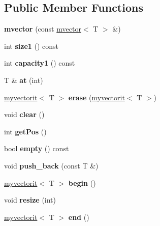 \subsection*{Public Member Functions}
\begin{DoxyCompactItemize}
\item 
\hypertarget{classmvector_a5eb821b582e42208a8b0eb96a3a8e1c0}{}{\bfseries mvector} (const \hyperlink{classmvector}{mvector}$<$ T $>$ \&)\label{classmvector_a5eb821b582e42208a8b0eb96a3a8e1c0}

\item 
\hypertarget{classmvector_a1a765c4c112032a89f4903515d6e8f4a}{}int {\bfseries size1} () const \label{classmvector_a1a765c4c112032a89f4903515d6e8f4a}

\item 
\hypertarget{classmvector_a4af7a5b896f47966d5a686cfa8ef399d}{}int {\bfseries capacity1} () const \label{classmvector_a4af7a5b896f47966d5a686cfa8ef399d}

\item 
\hypertarget{classmvector_ac1e8a58dd72be52c090058f50db96323}{}T \& {\bfseries at} (int)\label{classmvector_ac1e8a58dd72be52c090058f50db96323}

\item 
\hypertarget{classmvector_a4aa9329b30665373cd533e276cfb25cc}{}\hyperlink{classmyvectorit}{myvectorit}$<$ T $>$ {\bfseries erase} (\hyperlink{classmyvectorit}{myvectorit}$<$ T $>$)\label{classmvector_a4aa9329b30665373cd533e276cfb25cc}

\item 
\hypertarget{classmvector_a867f2a6f379c581732536269d2780a01}{}void {\bfseries clear} ()\label{classmvector_a867f2a6f379c581732536269d2780a01}

\item 
\hypertarget{classmvector_abc5bfa132b2e643fcea7c99331836236}{}int {\bfseries get\+Pos} ()\label{classmvector_abc5bfa132b2e643fcea7c99331836236}

\item 
\hypertarget{classmvector_ac67bac4c359e62f7f392be212dd23c5d}{}bool {\bfseries empty} () const \label{classmvector_ac67bac4c359e62f7f392be212dd23c5d}

\item 
\hypertarget{classmvector_afdc4697b5ecaae6d0beb7e4489295fd5}{}void {\bfseries push\+\_\+back} (const T \&)\label{classmvector_afdc4697b5ecaae6d0beb7e4489295fd5}

\item 
\hypertarget{classmvector_af2c0381438a96381c6f3e5bc38e6c2bb}{}\hyperlink{classmyvectorit}{myvectorit}$<$ T $>$ {\bfseries begin} ()\label{classmvector_af2c0381438a96381c6f3e5bc38e6c2bb}

\item 
\hypertarget{classmvector_ad77ddb390a675770ff5f019571a1b6be}{}void {\bfseries resize} (int)\label{classmvector_ad77ddb390a675770ff5f019571a1b6be}

\item 
\hypertarget{classmvector_afb9a0fe291dcc02702b7c91e39552768}{}\hyperlink{classmyvectorit}{myvectorit}$<$ T $>$ {\bfseries end} ()\label{classmvector_afb9a0fe291dcc02702b7c91e39552768}

\end{DoxyCompactItemize}
